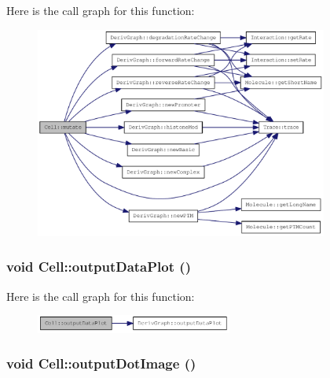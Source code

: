 Here is the call graph for this function:\nopagebreak
\begin{figure}[H]
\begin{center}
\leavevmode
\includegraphics[width=273pt]{classCell_a555fa98c5f1dc8d7c88c7a24f69994ff_cgraph}
\end{center}
\end{figure}
\hypertarget{classCell_a8e117526c56dda4d0d56d840d1558835}{
\subsubsection[{outputDataPlot}]{\setlength{\rightskip}{0pt plus 5cm}void Cell::outputDataPlot ()}}
\label{classCell_a8e117526c56dda4d0d56d840d1558835}


Here is the call graph for this function:\nopagebreak
\begin{figure}[H]
\begin{center}
\leavevmode
\includegraphics[width=183pt]{classCell_a8e117526c56dda4d0d56d840d1558835_cgraph}
\end{center}
\end{figure}
\hypertarget{classCell_a535ddddc0471fa874a0b22a54bd38c1a}{
\subsubsection[{outputDotImage}]{\setlength{\rightskip}{0pt plus 5cm}void Cell::outputDotImage ()}}
\label{classCell_a535ddddc0471fa874a0b22a54bd38c1a}


